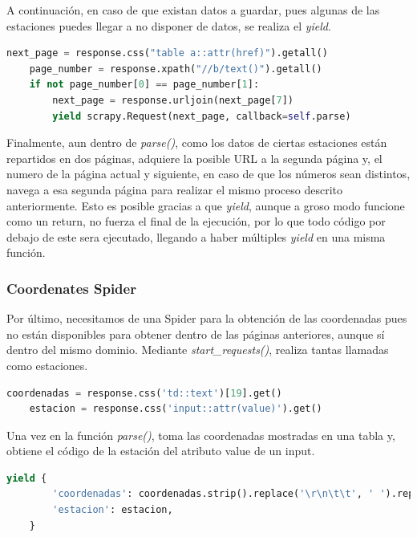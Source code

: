 A continuación, en caso de que existan datos a guardar, pues algunas de las estaciones puedes llegar a no disponer de datos, se realiza el \textit{yield}.

\begin{lstlisting}[language=Python, caption={Navegacion a segunda página de datos en MeteoNavarra Data Spider}]
	next_page = response.css("table a::attr(href)").getall()
	page_number = response.xpath("//b/text()").getall()
	if not page_number[0] == page_number[1]:
		next_page = response.urljoin(next_page[7])
		yield scrapy.Request(next_page, callback=self.parse)
\end{lstlisting}

Finalmente, aun dentro de \textit{parse()}, como los datos de ciertas estaciones están repartidos en dos páginas, adquiere la posible URL a la segunda página y, el numero de la página actual y siguiente, en caso de que los números sean distintos, navega a esa segunda página para realizar el mismo proceso descrito anteriormente.\newline
\newline
Esto es posible gracias a que \textit{yield}, aunque a groso modo funcione como un return, no fuerza el final de la ejecución, por lo que todo código por debajo de este sera ejecutado, llegando a haber múltiples \textit{yield} en una misma función.

\subsubsection{Coordenates Spider}
Por último, necesitamos de una Spider para la obtención de las coordenadas pues no están disponibles para obtener dentro de las páginas anteriores, aunque sí dentro del mismo dominio.\newline
\newline
Mediante \textit{start\_requests()}, realiza tantas llamadas como estaciones.

\begin{lstlisting}[language=Python, caption={Selector en \textit{parse()} de MeteoNavarra Coordenates Spider}]
	coordenadas = response.css('td::text')[19].get()
	estacion = response.css('input::attr(value)').get()
\end{lstlisting}

Una vez en la función \textit{parse()}, toma las coordenadas mostradas en una tabla y, obtiene el código de la estación del atributo value de un input.

\begin{lstlisting}[language=Python, caption={Guardado de datos de MeteoNavarra Coordenates Spider}]
	yield {
		'coordenadas': coordenadas.strip().replace('\r\n\t\t', ' ').replace(' (*)', ''),
		'estacion': estacion,
	}
\end{lstlisting}

